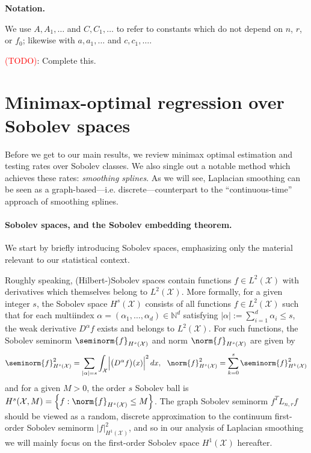 \documentclass{article}
\newcommand{\abs}[1]{\left \lvert #1 \right \rvert}
\newcommand{\set}[1]{\left\{#1\right\}}
\newcommand{\1}{\mathbf{1}}
\newcommand{\Lap}{L}
\newcommand{\Xset}{\mathcal{X}}
\newcommand{\Leb}{L}
\theoremstyle{alden}
\theoremstyle{aldenthm}
\theoremstyle{definition}
\theoremstyle{remark}
\begin{document}
\textbf{Notation.}

We use $A,A_1, \ldots$ and $C,C_1, \ldots$ to refer to constants which do not depend on $n$, $r$, or $f_0$; likewise with $a, a_1,\ldots$ and $c, c_1,\ldots$.

\textcolor{red}{(TODO)}: Complete this.

\section{Minimax-optimal regression over Sobolev spaces}
\label{sec:minimax_optimal_regression_sobolev_spaces}

Before we get to our main results, we review minimax optimal estimation and testing rates over Sobolev classes. We also single out a notable method which achieves these rates: \emph{smoothing splines}. As we will see, Laplacian smoothing can be seen as a graph-based---i.e. discrete---counterpart to the ``continuous-time'' approach of smoothing splines. 

\paragraph{Sobolev spaces, and the Sobolev embedding theorem.} We start by briefly introducing Sobolev spaces, emphasizing only the material relevant to our statistical context. 

Roughly speaking, (Hilbert-)Sobolev spaces contain functions $f \in \Leb^2(\Xset)$ with derivatives which themselves belong to $\Leb^2(\Xset)$. More formally, for a given integer $s$, the Sobolev space $H^{s}(\Xset)$ consists of all functions $f \in \Leb^2(\Xset)$ such that for each multiindex $\alpha = (\alpha_1,\ldots,\alpha_d) \in \mathbb{N}^d$ satisfying $\abs{\alpha} := \sum_{i = 1}^{d} \alpha_i \leq s$, the weak derivative $D^{\alpha}f$ exists and belongs to $\Leb^2(\Xset)$. For such functions, the Sobolev seminorm $\seminorm{f}_{H^{s}(\Xset)}$ and norm $\norm{f}_{H^{s}(\Xset)}$ are given by 
\begin{equation*}
\seminorm{f}_{H^s(\Xset)}^2 = \sum_{\abs{\alpha} = s}\int_{\mathcal{X}} \Bigl|\bigl(D^{\alpha}f\bigr)(x)\Bigr|^2 \,dx, ~~ \norm{f}_{H^{s}(\Xset)}^2 = \sum_{k = 0}^{s} \seminorm{f}_{H^k(\Xset)}^2
\end{equation*}
and for a given $M > 0$, the order $s$ Sobolev ball is $H^s(\Xset, M) = \set{f: \norm{f}_{H^s(\Xset)} \leq M}$. The graph Sobolev seminorm $f^T \Lap_{n,r} f$ should be viewed as a random, discrete approximation to the continuum first-order Sobolev seminorm $|f|_{H^1(\Xset)}^2$, and so in our analysis of Laplacian smoothing we will mainly focus on the first-order Sobolev space $H^1(\Xset)$ hereafter.
\end{document}
